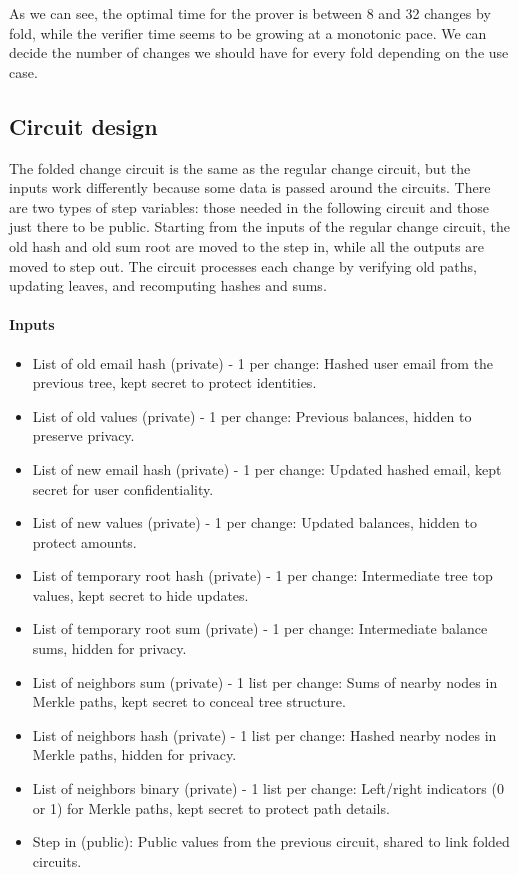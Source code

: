 As we can see, the optimal time for the prover is between 8 and 32 changes by fold, while the verifier time seems to be growing at a monotonic pace.
We can decide the number of changes we should have for every fold depending on the use case.

\subsection{Circuit design}
The folded change circuit is the same as the regular change circuit, but the inputs work differently because some data is passed around the circuits.
There are two types of step variables: those needed in the following circuit and those just there to be public.
Starting from the inputs of the regular change circuit, the old hash and old sum root are moved to the step in, while all the outputs are moved to step out. 
The circuit processes each change by verifying old paths, updating leaves, and recomputing hashes and sums.

\paragraph{Inputs}
\begin{itemize}
   \item List of old email hash (private) - 1 per change: Hashed user email from the previous tree, kept secret to protect identities.
   \item List of old values (private) - 1 per change: Previous balances, hidden to preserve privacy.
   \item List of new email hash (private) - 1 per change: Updated hashed email, kept secret for user confidentiality.
   \item List of new values (private) - 1 per change: Updated balances, hidden to protect amounts.
   \item List of temporary root hash (private) - 1 per change: Intermediate tree top values, kept secret to hide updates.
   \item List of temporary root sum (private) - 1 per change: Intermediate balance sums, hidden for privacy.
   \item List of neighbors sum (private) - 1 list per change: Sums of nearby nodes in Merkle paths, kept secret to conceal tree structure.
   \item List of neighbors hash (private) - 1 list per change: Hashed nearby nodes in Merkle paths, hidden for privacy.
   \item List of neighbors binary (private) - 1 list per change: Left/right indicators (0 or 1) for Merkle paths, kept secret to protect path details.
   \item Step in (public): Public values from the previous circuit, shared to link folded circuits.
   \end{itemize}

